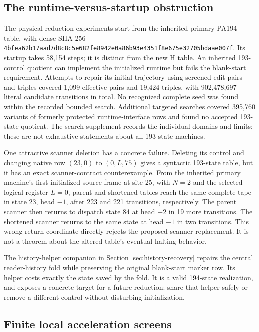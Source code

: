 \documentclass[11pt,a4paper]{article}
\begin{document}
\subsection{The runtime-versus-startup obstruction}

The physical reduction experiments start from the inherited primary
PA194 table, with dense SHA-256
\nolinkurl{4bfea62b17aad7d8c8c5e682fe8942e0a86b93e4351f8e675e32705bdaae007f}.
Its startup takes 58,154 steps; it is distinct from the new H table.
An inherited 193-control quotient can implement the initialized runtime
but fails the blank-start requirement. Attempts to repair its initial
trajectory using screened edit pairs and triples covered 1,099 effective
pairs and 19,424 triples, with 902,478,697 literal candidate transitions
in total. No recognized complete seed was found within the recorded
bounded search. Additional targeted searches covered 395,760 variants of
formerly protected runtime-interface rows and found no accepted
193-state quotient. The search supplement records the individual
domains and limits; these are not exhaustive statements about all
193-state machines.

One attractive scanner deletion has a concrete failure. Deleting its
control and changing native row $(23,0)$ to $(0,L,75)$ gives a syntactic
193-state table, but it has an exact scanner-contract counterexample.
From the inherited primary machine's first initialized source frame at
site 25, with $N=2$ and the selected logical register $L=0$, parent and
shortened tables reach the same
complete tape in state 23, head $-1$, after 223 and 221 transitions,
respectively. The parent scanner then returns to dispatch state 84 at
head $-2$ in 19 more transitions. The shortened scanner returns to the
same state at head $-1$ in two transitions. This wrong return coordinate
directly rejects the proposed scanner replacement. It is not a theorem
about the altered table's eventual halting behavior.

The history-helper companion in Section \ref{sec:history-recovery}
repairs the central reader-history fold while preserving the original
blank-start marker row. Its helper costs exactly the state saved by the
fold. It is a valid 194-state realization, and exposes a concrete target
for a future reduction: share that helper safely or remove a different
control without disturbing initialization.

\subsection{Finite local acceleration screens}
\end{document}

